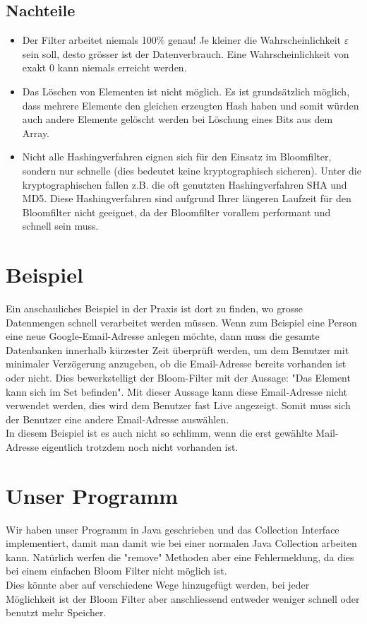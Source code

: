 \documentclass{article}
\begin{document}
    \subsection{Nachteile}
    \begin{itemize}[leftmargin=*]
        \item Der Filter arbeitet niemals 100\% genau! Je kleiner die Wahrscheinlichkeit $\varepsilon$ sein soll, desto grösser ist der Datenverbrauch. Eine Wahrscheinlichkeit von exakt $0$ kann niemals erreicht werden.
        \item Das Löschen von Elementen ist nicht möglich. Es ist grundsätzlich möglich, dass mehrere Elemente den gleichen erzeugten Hash haben und somit würden auch andere Elemente gelöscht werden bei Löschung eines Bits aus dem Array.
        \item Nicht alle Hashingverfahren eignen sich für den Einsatz im Bloomfilter, sondern nur schnelle (dies bedeutet keine kryptographisch sicheren). Unter die kryptographischen fallen z.B. die oft genutzten Hashingverfahren SHA und MD5. Diese Hashingverfahren sind aufgrund Ihrer längeren Laufzeit für den Bloomfilter nicht geeignet, da der Bloomfilter vorallem performant und schnell sein muss.
    \end{itemize}


    \section{Beispiel}
    Ein anschauliches Beispiel in der Praxis ist dort zu finden, wo grosse Datenmengen schnell verarbeitet werden müssen. Wenn zum Beispiel eine Person eine neue Google-Email-Adresse anlegen möchte, dann muss die gesamte Datenbanken innerhalb kürzester Zeit überprüft werden, um dem Benutzer mit minimaler Verzögerung anzugeben, ob die Email-Adresse bereits vorhanden ist oder nicht. Dies bewerkstelligt der Bloom-Filter mit der Aussage: "Das Element kann sich im Set befinden". Mit dieser Aussage kann diese Email-Adresse nicht verwendet werden, dies wird dem Benutzer fast Live angezeigt. Somit muss sich der Benutzer eine andere Email-Adresse auswählen. \\
    In diesem Beispiel ist es auch nicht so schlimm, wenn die erst gewählte Mail-Adresse eigentlich trotzdem noch nicht vorhanden ist.


    \section{Unser Programm}
    Wir haben unser Programm in Java geschrieben und das Collection Interface implementiert, damit man damit wie bei einer normalen Java Collection arbeiten kann. Natürlich werfen die "remove" Methoden aber eine Fehlermeldung, da dies bei einem einfachen Bloom Filter nicht möglich ist. \\
    Dies könnte aber auf verschiedene Wege hinzugefügt werden, bei jeder Möglichkeit ist der Bloom Filter aber anschliessend entweder weniger schnell oder benutzt mehr Speicher.
\end{document}
